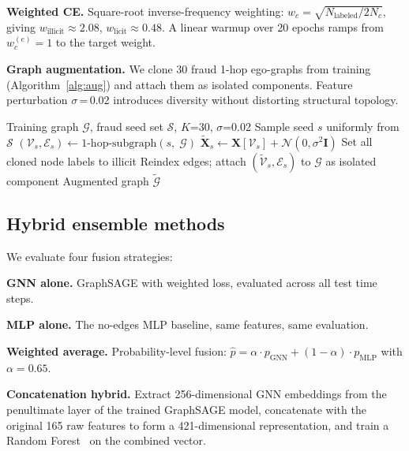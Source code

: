 \textbf{Weighted CE.}  Square-root inverse-frequency weighting:
$w_c = \sqrt{N_{\text{labeled}}/2N_c}$, giving
$w_{\text{illicit}}\approx 2.08$, $w_{\text{licit}}\approx 0.48$.
A linear warmup over 20 epochs ramps from $w_c^{(e)}=1$ to the target
weight.

\textbf{Graph augmentation.}  We clone 30 fraud 1-hop ego-graphs from
training (Algorithm~\ref{alg:aug}) and attach them as isolated
components.  Feature perturbation $\sigma$\,=\,0.02 introduces
diversity without distorting structural topology.

\begin{algorithm}[!htbp]
\caption{Structural graph augmentation}
\label{alg:aug}
\begin{algorithmic}[1]
\REQUIRE Training graph $\mathcal{G}$, fraud seed set $\mathcal{S}$,
  $K$=30, $\sigma$=0.02
  \STATE Sample seed $s$ uniformly from $\mathcal{S}$
  \STATE $(\mathcal{V}_s, \mathcal{E}_s) \leftarrow
    \text{1-hop-subgraph}(s,\;\mathcal{G})$
  \STATE $\tilde{\mathbf{X}}_s \leftarrow \mathbf{X}[\mathcal{V}_s]
    + \mathcal{N}(0,\sigma^2\mathbf{I})$
  \STATE Set all cloned node labels to illicit
  \STATE Reindex edges; attach $(\tilde{\mathcal{V}}_s, \mathcal{E}_s)$
    to $\mathcal{G}$ as isolated component
\ENDFOR
\RETURN Augmented graph $\tilde{\mathcal{G}}$
\end{algorithmic}
\end{algorithm}

\subsection{Hybrid ensemble methods}
\label{sec:hybrid_methods}

We evaluate four fusion strategies:

\textbf{GNN alone.}  GraphSAGE with weighted loss, evaluated across
all test time steps.

\textbf{MLP alone.}  The no-edges MLP baseline, same features, same
evaluation.

\textbf{Weighted average.}  Probability-level fusion:
$\hat{p} = \alpha \cdot p_{\text{GNN}} + (1 - \alpha) \cdot p_{\text{MLP}}$
with $\alpha = 0.65$.

\textbf{Concatenation hybrid.}  Extract 256-dimensional GNN embeddings
from the penultimate layer of the trained GraphSAGE model, concatenate
with the original 165 raw features to form a 421-dimensional
representation, and train a Random Forest~\citep{breiman2001rf} on
the combined vector.

